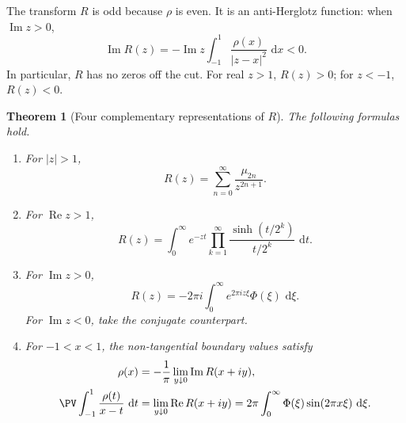 \documentclass[11pt,oneside]{article}
\newtheorem{theorem}{Theorem}[section]
\theoremstyle{definition}
\newcommand{\dd}{\,\mathrm d}
\begin{document}
The transform \(R\) is odd because \(\rho\) is even.  It is an anti-Herglotz function:
when \(\operatorname{Im}z>0\),
\begin{equation}
 \operatorname{Im}R(z)
 =-\operatorname{Im}z\int_{-1}^{1}\frac{\rho(x)}{|z-x|^2}\,\dd x<0. \label{p3:eq:R-anti-Herglotz}
\end{equation}
In particular, \(R\) has no zeros off the cut.  For real \(z>1\), \(R(z)>0\); for
\(z<-1\), \(R(z)<0\).

\begin{theorem}[Four complementary representations of \(R\)]\label{p3:thm:R-representations}
The following formulas hold.

\begin{enumerate}[label=(\roman*)]
\item For \(|z|>1\),
\begin{equation}
 R(z)=\sum_{n=0}^{\infty}\frac{\mu_{2n}}{z^{2n+1}}.          \label{p3:eq:R-moment}
\end{equation}
\item For \(\operatorname{Re}z>1\),
\begin{equation}
 R(z)=\int_0^{\infty}e^{-zt}
 \prod_{k=1}^{\infty}\frac{\sinh(t/2^k)}{t/2^k}\,\dd t.    \label{p3:eq:R-Laplace}
\end{equation}
\item For \(\operatorname{Im}z>0\),
\begin{equation}
 R(z)=-2\pi i\int_0^{\infty}e^{2\pi i z\xi}\Phi(\xi)\,\dd\xi. \label{p3:eq:R-Fourier-Laplace}
\end{equation}
For \(\operatorname{Im}z<0\), take the conjugate counterpart.
\item For \(-1<x<1\), the non-tangential boundary values satisfy
\begin{align}
 \rho(x)&=-\frac1\pi\lim_{y\downarrow0}\operatorname{Im}R(x+iy),
                                                               \label{p3:eq:R-boundary-density}\\
 \PV\int_{-1}^{1}\frac{\rho(t)}{x-t}\,\dd t
 &=\lim_{y\downarrow0}\operatorname{Re}R(x+iy)
 =2\pi\int_0^{\infty}\Phi(\xi)\sin(2\pi x\xi)\,\dd\xi.     \label{p3:eq:R-boundary-Hilbert}
\end{align}
\end{enumerate}
\end{theorem}
\end{document}
